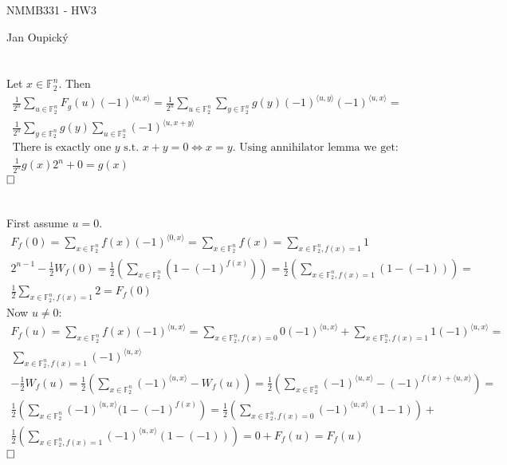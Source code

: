 \documentclass[12pt, a4paper]{article}
\newcommand{\qed}{\hfill\square}
\begin{document}
\begin{center}
\large NMMB331 - HW3

\normalsize Jan Oupický
\end{center}
\vspace{1\baselineskip}

\section{}
Let $x \in \mathbb{F}^n_2$. Then
\begin{gather*}
\frac{1}{2^n}\sum\limits_{u \in \mathbb{F}^n_2} F_g(u)(-1)^{\langle u, x \rangle} = \frac{1}{2^n}\sum\limits_{u \in \mathbb{F}^n_2} \sum\limits_{y \in \mathbb{F}^n_2}g(y)(-1)^{\langle u, y \rangle} (-1)^{\langle u, x \rangle} = \\
\frac{1}{2^n}\sum\limits_{y \in \mathbb{F}^n_2} g(y)\sum\limits_{u \in \mathbb{F}^n_2}(-1)^{\langle u, x+y \rangle}\\
\text{There is exactly one $y$ s.t. $x+y=0 \iff x=y$. Using annihilator lemma we get:}\\
\frac{1}{2^n}g(x)2^n + 0 = g(x)
\end{gather*}
$\qed$

\section{}
First assume $u=0$.
\begin{gather*}
F_f(0)=\sum\limits_{x \in \mathbb{F}^n_2}f(x)(-1)^{\langle 0,x \rangle} = \sum\limits_{x \in \mathbb{F}^n_2}f(x) = \sum\limits_{x \in \mathbb{F}^n_2, f(x)=1}1\\
2^{n-1}-\frac{1}{2}W_f(0) = \frac{1}{2}\left(\sum\limits_{x \in \mathbb{F}^n_2}(1-(-1)^{f(x)})\right) = \frac{1}{2}\left(\sum\limits_{x \in \mathbb{F}^n_2, f(x)=1}(1-(-1))\right)=\\
\frac{1}{2}\sum\limits_{x \in \mathbb{F}^n_2, f(x)=1}2 = F_f(0)
\end{gather*}
Now $u \neq 0$:
\begin{gather*}
F_f(u)=\sum\limits_{x \in \mathbb{F}^n_2}f(x)(-1)^{\langle u,x \rangle} = \sum\limits_{x \in \mathbb{F}^n_2,f(x)=0}0(-1)^{\langle u,x \rangle} + \sum\limits_{x \in \mathbb{F}^n_2,f(x)=1}1(-1)^{\langle u,x \rangle} =\\
\sum\limits_{x \in \mathbb{F}^n_2,f(x)=1}(-1)^{\langle u,x \rangle}\\
-\frac{1}{2}W_f(u) =\frac{1}{2}\left( \sum\limits_{x \in \mathbb{F}^n_2}(-1)^{\langle u,x \rangle} - W_f(u) \right) = \frac{1}{2}\left( \sum\limits_{x \in \mathbb{F}^n_2}(-1)^{\langle u,x \rangle} - (-1)^{f(x)+\langle u,x \rangle} \right) = \\
\frac{1}{2}\left( \sum\limits_{x \in \mathbb{F}^n_2}(-1)^{\langle u,x \rangle}(1 - (-1)^{f(x)} \right) = \frac{1}{2}\left( \sum\limits_{x \in \mathbb{F}^n_2, f(x)=0}(-1)^{\langle u,x \rangle}(1 - 1) \right) + \\
\frac{1}{2}\left( \sum\limits_{x \in \mathbb{F}^n_2, f(x)=1}(-1)^{\langle u,x \rangle}(1 - (-1)) \right) = 0 + F_f(u) = F_f(u)
\end{gather*}
$\qed$
\end{document}
